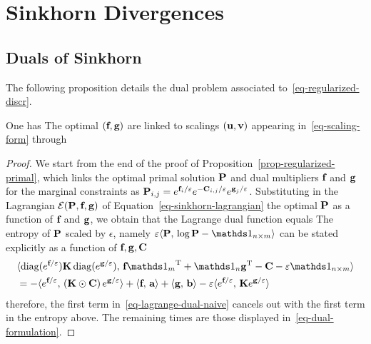 
\section{Sinkhorn Divergences}

\subsection{Duals of Sinkhorn}

The following proposition details the dual problem associated to~\eqref{eq-regularized-discr}.

\begin{prop}
One has
%
The optimal $(\fD,\gD)$ are linked to scalings $(\uD,\vD)$ appearing in~\eqref{eq-scaling-form} through 
\end{prop}

\begin{proof}
We start from the end of the proof of Proposition~\ref{prop-regularized-primal}, which links the optimal primal solution $\P$ and dual multipliers $\fD$ and $\gD$ for the marginal constraints as $\P_{i,j}=e^{\fD_i/\varepsilon}e^{-\C_{i,j}/\varepsilon}e^{\gD_j/\varepsilon}$. Substituting in the Lagrangian $\Lag(\P,\fD,\gD)$ of Equation~\eqref{eq-sinkhorn-lagrangian} the optimal $\P$ as a function of $\fD$ and $\gD$, we obtain that the Lagrange dual function equals
The entropy of $\P$ scaled by $\epsilon$, namely $\epsilon \dotp{\P}{\log \P - \ones_{n\times m}}$ can be stated explicitly as a function of $\fD,\gD, \C$
\begin{align*}
&\dotp{\diag(e^{\fD/\epsilon}) \K \diag(e^{\gD/\epsilon})}{\fD\transp{\ones_m}+\ones_n\transp{\gD}-\C-\epsilon\ones_{n\times m}}\\
&= -\dotp{e^{\fD/\epsilon}}{\left(\K\odot \C\right)e^{\gD/\epsilon}} + \dotp{\fD}{\a}+ \dotp{\gD}{\b}-\epsilon \dotp{e^{\fD/\epsilon}}{\K e^{\gD/\epsilon}}
\end{align*}
therefore, the first term in~\eqref{eq-lagrange-dual-naive} cancels out with the first term in the entropy above. The remaining times are those displayed in~\eqref{eq-dual-formulation}.
\end{proof}

